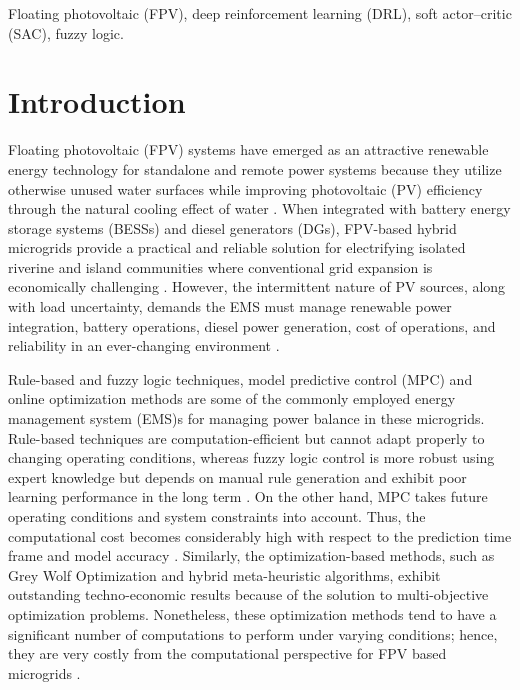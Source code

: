 \documentclass[journal]{IEEEtran}
\begin{document}
\begin{IEEEkeywords}
Floating photovoltaic (FPV), deep reinforcement learning (DRL), soft actor--critic (SAC), fuzzy logic.
\end{IEEEkeywords}

\section{Introduction}

Floating photovoltaic (FPV) systems have emerged as an attractive renewable
energy technology for standalone and remote power systems because they utilize
otherwise unused water surfaces while improving photovoltaic (PV) efficiency through
the natural cooling effect of water \cite{Garrod2024,Temiz2022,Esparza2024}. When integrated with battery energy
storage systems (BESSs) and diesel generators (DGs), FPV-based hybrid
microgrids provide a practical and reliable solution for electrifying isolated
riverine and island communities where conventional grid expansion is
economically challenging \cite{Temiz2022,Gizaw2024}. However, the intermittent nature of PV sources, along with load uncertainty, demands the EMS must manage renewable power integration, battery operations, diesel power generation, cost of operations, and reliability in an ever-changing environment \cite{Garrod2024,Temiz2022,Esparza2024,Gizaw2024}.

Rule-based and fuzzy logic techniques, model predictive control (MPC) and online optimization methods are some of the commonly employed energy management system (EMS)s for managing power balance in these microgrids. Rule-based techniques are computation-efficient but cannot adapt properly to changing operating conditions, whereas fuzzy logic control is more robust using expert knowledge but depends on manual rule generation and exhibit poor learning performance in the long term \cite{Kumar2023,Kaysal2022}. On the other hand, MPC takes future operating conditions and system constraints into account. Thus, the computational cost becomes considerably high with respect to the prediction time frame and model accuracy \cite{Batiyah2020,Nair2020}. Similarly, the optimization-based methods, such as Grey Wolf Optimization and hybrid meta-heuristic algorithms, exhibit outstanding techno-economic results because of the solution to multi-objective optimization problems. Nonetheless, these optimization methods tend to have a significant number of computations to perform under varying conditions; hence, they are very costly from the computational perspective for FPV based microgrids \cite{Tukkee2024,Pramila2024}.
\end{document}
